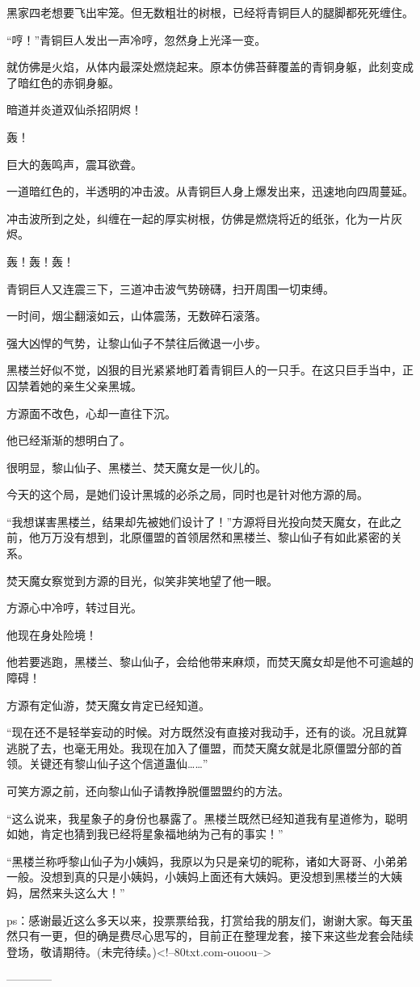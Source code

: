 \begin{this_body}
黑家四老想要飞出牢笼。但无数粗壮的树根，已经将青铜巨人的腿脚都死死缠住。

“哼！”青铜巨人发出一声冷哼，忽然身上光泽一变。

就仿佛是火焰，从体内最深处燃烧起来。原本仿佛苔藓覆盖的青铜身躯，此刻变成了暗红色的赤铜身躯。

暗道并炎道双仙杀招阴烬！

轰！

巨大的轰鸣声，震耳欲聋。

一道暗红色的，半透明的冲击波。从青铜巨人身上爆发出来，迅速地向四周蔓延。

冲击波所到之处，纠缠在一起的厚实树根，仿佛是燃烧将近的纸张，化为一片灰烬。

轰！轰！轰！

青铜巨人又连震三下，三道冲击波气势磅礴，扫开周围一切束缚。

一时间，烟尘翻滚如云，山体震荡，无数碎石滚落。

强大凶悍的气势，让黎山仙子不禁往后微退一小步。

黑楼兰好似不觉，凶狠的目光紧紧地盯着青铜巨人的一只手。在这只巨手当中，正囚禁着她的亲生父亲黑城。

方源面不改色，心却一直往下沉。

他已经渐渐的想明白了。

很明显，黎山仙子、黑楼兰、焚天魔女是一伙儿的。

今天的这个局，是她们设计黑城的必杀之局，同时也是针对他方源的局。

“我想谋害黑楼兰，结果却先被她们设计了！”方源将目光投向焚天魔女，在此之前，他万万没有想到，北原僵盟的首领居然和黑楼兰、黎山仙子有如此紧密的关系。

焚天魔女察觉到方源的目光，似笑非笑地望了他一眼。

方源心中冷哼，转过目光。

他现在身处险境！

他若要逃跑，黑楼兰、黎山仙子，会给他带来麻烦，而焚天魔女却是他不可逾越的障碍！

方源有定仙游，焚天魔女肯定已经知道。

“现在还不是轻举妄动的时候。对方既然没有直接对我动手，还有的谈。况且就算逃脱了去，也毫无用处。我现在加入了僵盟，而焚天魔女就是北原僵盟分部的首领。关键还有黎山仙子这个信道蛊仙……”

可笑方源之前，还向黎山仙子请教挣脱僵盟盟约的方法。

“这么说来，我星象子的身份也暴露了。黑楼兰既然已经知道我有星道修为，聪明如她，肯定也猜到我已经将星象福地纳为己有的事实！”

“黑楼兰称呼黎山仙子为小姨妈，我原以为只是亲切的昵称，诸如大哥哥、小弟弟一般。没想到真的只是小姨妈，小姨妈上面还有大姨妈。更没想到黑楼兰的大姨妈，居然来头这么大！”

ps：感谢最近这么多天以来，投票票给我，打赏给我的朋友们，谢谢大家。每天虽然只有一更，但的确是费尽心思写的，目前正在整理龙套，接下来这些龙套会陆续登场，敬请期待。(未完待续。)<!--80txt.com-ouoou-->

------------

\end{this_body}

